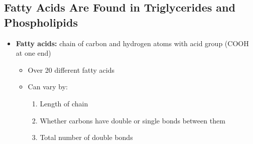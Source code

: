 \documentclass[12pt]{article}
\begin{document}
        \subsection{Fatty Acids Are Found in Triglycerides and Phospholipids}
            \begin{itemize}
                \item \textbf{Fatty acids:} chain of carbon and hydrogen atoms with acid group (COOH at one end)
                    \begin{itemize}
                        \item Over 20 different fatty acids
                        \item Can vary by:
                            \begin{enumerate}
                                \item Length of chain
                                \item Whether carbons have double or single bonds between them
                                \item Total number of double bonds
                            \end{enumerate}
                    \end{itemize}
            \end{itemize}
\end{document}
